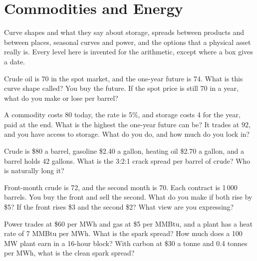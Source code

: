 \chapter{Commodities and Energy}\label{ch:iv2:commodities-and-energy}

\begin{ivtrains}
Curve shapes and what they say about storage, spreads between products and between places, seasonal curves and power, and the options that a physical asset really is. Every level here is invented for the arithmetic, except where a box gives a date.
\end{ivtrains}

\begin{question}\label{iq:iv2:commodities-and-energy:1}
Crude oil is 70 in the spot market, and the one-year future is 74. What is this curve shape called? You buy the future. If the spot price is still 70 in a year, what do you make or lose per barrel?
\end{question}

\begin{question}\label{iq:iv2:commodities-and-energy:2}
A commodity costs 80 today, the rate is 5\%, and storage costs 4 for the year, paid at the end. What is the highest the one-year future can be? It trades at 92, and you have access to storage. What do you do, and how much do you lock in?
\end{question}

\begin{question}\label{iq:iv2:commodities-and-energy:3}
Crude is \$80 a barrel, gasoline \$2.40 a gallon, heating oil \$2.70 a gallon, and a barrel holds 42 gallons. What is the 3:2:1 crack spread per barrel of crude? Who is naturally long it?
\end{question}

\begin{question}\label{iq:iv2:commodities-and-energy:4}
Front-month crude is 72, and the second month is 70. Each contract is 1\,000 barrels. You buy the front and sell the second. What do you make if both rise by \$5? If the front rises \$3 and the second \$2? What view are you expressing?
\end{question}

\begin{question}\label{iq:iv2:commodities-and-energy:5}
Power trades at \$60 per MWh and gas at \$5 per MMBtu, and a plant has a heat rate of 7 MMBtu per MWh. What is the spark spread? How much does a 100 MW plant earn in a 16-hour block? With carbon at \$30 a tonne and 0.4 tonnes per MWh, what is the clean spark spread?
\end{question}

